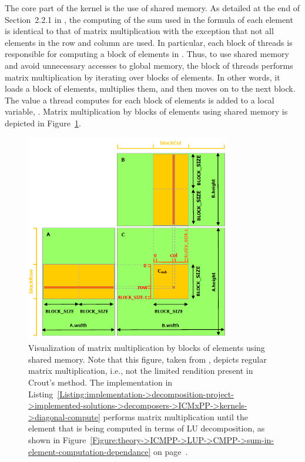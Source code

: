The core part of the kernel is the use of shared memory.
As detailed at the end of Section~2.2.1 in  \cite{Cejka2022}, the computing of the sum used in the formula of each element is identical to that of matrix multiplication with the exception that not all elements in the row and column are used.
In particular, each block of threads is responsible for computing a block of elements in .
Thus, to use shared memory and avoid unnecessary accesses to global memory, the block of threads performs matrix multiplication by iterating over blocks of elements.
In other words, it loads a block of elements, multiplies them, and then moves on to the next block.
The value a thread computes for each block of elements is added to a local variable, .
Matrix multiplication by blocks of elements using shared memory is depicted in Figure~\ref{Figure:implementation->decomposition-project->implemented-solutions->decomposers->ICMxPP->CUDA-matrix-multiplication-with-shared-memory}.

\begin{figure}[ht!]
	\centering
	\includegraphics[width=0.8\textwidth, keepaspectratio]{images/ch02/CUDA-matrix-multiplication-by-blocks-using-shared-memory.png}
	\caption{Visualization of matrix multiplication by blocks of elements using shared memory.
		Note that this figure, taken from  \cite{NVIDIADecember2022}, depicts regular matrix multiplication, i.e., not the limited rendition present in Crout's method.
		The implementation in Listing~\ref{Listing:implementation->decomposition-project->implemented-solutions->decomposers->ICMxPP->kernels->diagonal-compute} performs matrix multiplication until the element that is being computed in terms of LU decomposition, as shown in Figure~\ref{Figure:theory->ICMPP->LUP->CMPP->sum-in-element-computation-dependance} on page~\pageref{Figure:theory->ICMPP->LUP->CMPP->sum-in-element-computation-dependance}.
	}
	\label{Figure:implementation->decomposition-project->implemented-solutions->decomposers->ICMxPP->CUDA-matrix-multiplication-with-shared-memory}
\end{figure}

